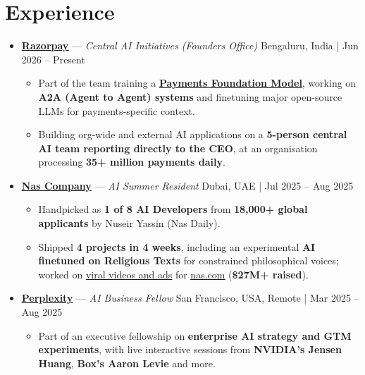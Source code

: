 \documentclass[letterpaper,11pt]{article}
\let\oldhref\href
\renewcommand{\href}[2]{\oldhref{#1}{\textcolor{linknavy}{\uline{#2}}}}
\newcommand{\resumeSubHeadingListStart}{\begin{itemize}[leftmargin=*, itemsep=3pt, parsep=0pt, topsep=3.5pt]}
\newcommand{\resumeSubHeadingListEnd}{\end{itemize}}
\begin{document}
\section*{Experience}
\resumeSubHeadingListStart
  \item
    \textbf{\href{https://razorpay.com}{Razorpay}} — \textit{Central AI Initiatives (Founders Office)} \hfill \textnormal{Bengaluru, India | Jun 2026 -- Present}
    \vspace{1pt}
    \begin{itemize}[leftmargin=*, itemsep=0pt, topsep=1pt, partopsep=0pt]
      \item Part of the team training a \textbf{\href{https://razorpay.com/blog/vulcan-how-razorpay-built-a-foundation-model-for-payment-decisions/}{Payments Foundation Model}}, working on \textbf{A2A (Agent to Agent) systems} and finetuning major open-source LLMs for payments-specific context.
      \item Building org-wide and external AI applications on a \textbf{5-person central AI team reporting directly to the CEO}, at an organisation processing \textbf{35+ million payments daily}.
    \end{itemize}
  \item
    \textbf{\href{http://cdn.kuber.studio/assets/docs/AI-Summer-Internship.pdf}{Nas Company}} — \textit{AI Summer Resident} \hfill \textnormal{Dubai, UAE | Jul 2025 -- Aug 2025}
    \vspace{1pt}
    \begin{itemize}[leftmargin=*, itemsep=0pt, topsep=1pt, partopsep=0pt]
      \item Handpicked as \textbf{1 of 8 AI Developers} from \textbf{18,000+ global applicants} by Nuseir Yassin (Nas Daily).
      \item Shipped \textbf{4 projects in 4 weeks}, including an experimental \textbf{AI finetuned on Religious Texts} for constrained philosophical voices; worked on \href{https://www.instagram.com/reel/DMu9PyNueI4/}{viral videos and ads} for \href{https://nas.com}{nas.com} (\textbf{\$27M+ raised}).
    \end{itemize}
  \item
    \textbf{\href{https://www.perplexity.ai/business-fellowship}{Perplexity}} — \textit{AI Business Fellow} \hfill \textnormal{San Francisco, USA, Remote | Mar 2025 -- Aug 2025}
    \vspace{1pt}
    \begin{itemize}[leftmargin=*, itemsep=0pt, topsep=1pt, partopsep=0pt]
      \item Part of an executive fellowship on \textbf{enterprise AI strategy and GTM experiments}, with live interactive sessions from \textbf{NVIDIA's Jensen Huang}, \textbf{Box's Aaron Levie} and more.
    \end{itemize}
\resumeSubHeadingListEnd
\end{document}
